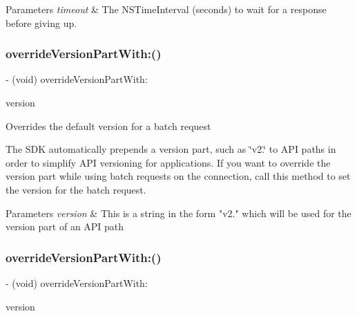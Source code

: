 \begin{DoxyParams}{Parameters}
{\em timeout} & The {\ttfamily N\+S\+Time\+Interval} (seconds) to wait for a response before giving up. \\
\hline
\end{DoxyParams}
\mbox{\label{interfaceFBRequestConnection_a225e5854a3413c22bff120114889ad07}} 
\subsubsection{\texorpdfstring{override\+Version\+Part\+With\+:()}{overrideVersionPartWith:()}\hspace{0.1cm}{\footnotesize\ttfamily [1/5]}}
{\footnotesize\ttfamily -\/ (void) override\+Version\+Part\+With\+: \begin{DoxyParamCaption}\item[{(N\+S\+String $\ast$)}]{version }\end{DoxyParamCaption}}

Overrides the default version for a batch request

The S\+DK automatically prepends a version part, such as \char`\"{}v2.\char`\"{} to A\+PI paths in order to simplify A\+PI versioning for applications. If you want to override the version part while using batch requests on the connection, call this method to set the version for the batch request.


\begin{DoxyParams}{Parameters}
{\em version} & This is a string in the form "v2." which will be used for the version part of an A\+PI path \\
\hline
\end{DoxyParams}
\mbox{\label{interfaceFBRequestConnection_a225e5854a3413c22bff120114889ad07}} 
\subsubsection{\texorpdfstring{override\+Version\+Part\+With\+:()}{overrideVersionPartWith:()}\hspace{0.1cm}{\footnotesize\ttfamily [2/5]}}
{\footnotesize\ttfamily -\/ (void) override\+Version\+Part\+With\+: \begin{DoxyParamCaption}\item[{(N\+S\+String $\ast$)}]{version }\end{DoxyParamCaption}}

